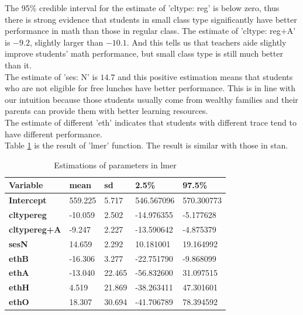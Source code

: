 \documentclass[11pt,a4paper]{article}
\begin{document}
The 95\% credible interval for the
estimate of 'cltype: reg' is below zero, thus there is strong evidence that students in small class type significantly have better 
performance in math than those in regular class. The estimate of 'cltype: reg+A' is $-9.2$, slightly larger than $-10.1$. 
And this tells us that teachers aide slightly improve students’ math performance, but small class type is still much better than it.\\

The estimate of 'ses: N' is $14.7$ and this positive estimation means that students who are not eligible for free lunches have
better performance. This is in line with our intuition because those students usually come from wealthy families and their 
parents can provide them with better learning resources.\\

The estimate of different 'eth' indicates that students with different trace tend to have different performance.\\


Table \ref{tab:lmer} is the result of 'lmer' function. The result is similar with those in stan.

\begin{table}[h]
    \centering
    \caption{Estimations of parameters in lmer}
    \label{tab:lmer}
    \begin{tabular}{|l|l|l|l|l|}
    \hline
    \textbf{Variable}    & \textbf{mean} & \textbf{sd} & \textbf{2.5\%} & \textbf{97.5\%} \\ \hline
    \textbf{Intercept}   & 559.225       & 5.717       & 546.567096     & 570.300773      \\ \hline
    \textbf{cltypereg}   & -10.059       & 2.502       & -14.976355     & -5.177628       \\ \hline
    \textbf{cltypereg+A} & -9.247        & 2.227       & -13.590642     & -4.875379       \\ \hline
    \textbf{sesN}        & 14.659        & 2.292       & 10.181001      & 19.164992       \\ \hline
    \textbf{ethB}        & -16.306       & 3.277       & -22.751790     & -9.868099       \\ \hline
    \textbf{ethA}        & -13.040       & 22.465      & -56.832600     & 31.097515       \\ \hline
    \textbf{ethH}        & 4.519         & 21.869      & -38.263411     & 47.301601       \\ \hline
    \textbf{ethO}        & 18.307        & 30.694      & -41.706789     & 78.394592       \\ \hline
    \end{tabular}
\end{table}
\end{document}

